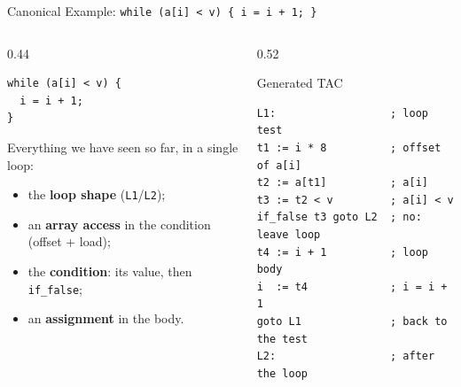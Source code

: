 \documentclass[aspectratio=169,11pt,xcolor=table]{beamer}
\newcommand{\tc}[1]{\texttt{#1}}
\begin{document}
\begin{frame}[fragile]{Canonical Example: \tc{while (a[i] < v) \{ i = i + 1; \}}}
  \begin{columns}[T]
    \begin{column}{0.44\textwidth}
      \begin{verbatim}
while (a[i] < v) {
  i = i + 1;
}
      \end{verbatim}
      \small Everything we have seen so far, in a single loop:
      \begin{itemize}
        \item the \textbf{loop shape} (\tc{L1}/\tc{L2});
        \item an \textbf{array access} in the condition (offset + load);
        \item the \textbf{condition}: its value, then \tc{if\_false};
        \item an \textbf{assignment} in the body.
      \end{itemize}
    \end{column}
    \begin{column}{0.52\textwidth}
      \begin{block}{Generated TAC}
        \begin{verbatim}
L1:                  ; loop test
t1 := i * 8          ; offset of a[i]
t2 := a[t1]          ; a[i]
t3 := t2 < v         ; a[i] < v
if_false t3 goto L2  ; no: leave loop
t4 := i + 1          ; loop body
i  := t4             ; i = i + 1
goto L1              ; back to the test
L2:                  ; after the loop
        \end{verbatim}
      \end{block}
    \end{column}
  \end{columns}
\end{frame}
\end{document}
